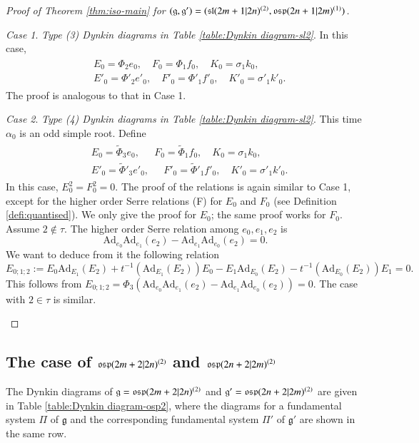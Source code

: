 \documentclass[12pt]{amsart}
\theoremstyle{definition}
\theoremstyle{remark}
\numberwithin{equation}{section}
\newtheorem{case}{Case}
\begin{document}
\begin{proof}[Proof of Theorem \ref{thm:iso-main} for $({{\mathfrak g}}, {{\mathfrak g}}')=({{\rm\mathfrak{sl}}}(2m+1|2n)^{(2)}, {{\rm\mathfrak{osp}}}(2n+1|2m)^{(1)})$]
\begin{case}
{\em Type (3) Dynkin diagrams in Table \ref{table:Dynkin diagram-sl2}}.
In this case, 
\begin{eqnarray}\label{eq:connect AB-case3}
\begin{aligned}
&E_0=\Phi_{2}e_0,\quad F_0=\Phi_1 f_0, \quad K_0=\sigma_1k_0,\\
&E'_0=\Phi'_{2}e'_0,\quad F'_0=\Phi'_1 f'_0, \quad K'_0=\sigma'_1k'_0.
\end{aligned}
\end{eqnarray}
The proof is analogous to that in Case 1. 
\end{case}

\begin{case}
{\em Type (4) Dynkin diagrams in Table \ref{table:Dynkin diagram-sl2}}.
This time $\alpha_0$ is an odd simple root. Define
\begin{eqnarray}\label{eq:connect AB-case4}
\begin{aligned}
&E_0=\tilde{\Phi}_{3}e_0,\quad \ \ F_0= \tilde{\Phi}_1 f_0,\quad K_0=\sigma_1k_0,\\
&E'_0=\tilde{\Phi}'_{3}e'_0,\quad \ \ F'_0= \tilde{\Phi}'_1 f'_0,\quad K'_0=\sigma'_1k'_0.
\end{aligned}
\end{eqnarray}
In this case, $E_0^2=F_0^2=0$.
The proof of the relations is again similar to Case 1, except for the higher order Serre relations (F) for $E_0$ and $F_0$ (see Definition \ref{defi:quantised}). We only give the proof for $E_0$; the same proof works for $F_0$.
Assume $2\notin\tau$. The higher order Serre relation among $e_0,e_1,e_2$  is
\[{{\mbox{Ad}}}_{e_0}{{\mbox{Ad}}}_{e_1}(e_2)-{{\mbox{Ad}}}_{e_1}{{\mbox{Ad}}}_{e_0}(e_2)=0.\]
 We want to deduce from it the following relation
\[
E_{0;1;2}:=E_0{{\mbox{Ad}}}_{E_1}(E_2)+t^{-1}({{\mbox{Ad}}}_{E_1}(E_2))E_0-E_1{{\mbox{Ad}}}_{E_0}(E_2)-t^{-1}({{\mbox{Ad}}}_{E_0}(E_2))E_1=0.
\]
This follows from 
$
E_{0;1;2}=\Phi_3({{\mbox{Ad}}}_{e_0}{{\mbox{Ad}}}_{e_1}(e_2)-{{\mbox{Ad}}}_{e_1}{{\mbox{Ad}}}_{e_0}(e_2)) =0.
$
The case with $2\in\tau$ is similar.
\end{case}
\end{proof}

\subsection{The case of  ${{\rm\mathfrak{osp}}}(2m+2|2n)^{(2)}$ and ${{\rm\mathfrak{osp}}}(2n+2|2m)^{(2)}$}\label{sect:osp2}
\setcounter{case}{0}
The Dynkin diagrams of ${{\mathfrak g}}={{\rm\mathfrak{osp}}}(2m+2|2n)^{(2)}$ and ${{\mathfrak g}}'={{\rm\mathfrak{osp}}}(2n+2|2m)^{(2)}$ are  given in Table \ref{table:Dynkin diagram-osp2}, 
where the diagrams for a fundamental system $\Pi$ of ${{\mathfrak g}}$ and the corresponding fundamental system  $\Pi'$ of ${{\mathfrak g}}'$ are shown in the same row.
\end{document}
